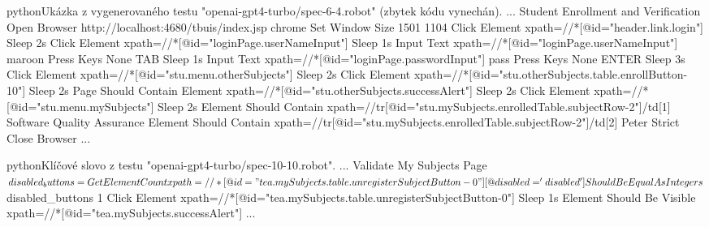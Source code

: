 \documentclass[czech, ma, kiv, he, iso690numb, pdf, viewonly]{fasthesis}
\begin{document}
            \begin{code}{python}{Ukázka z vygenerovaného testu "openai-gpt4-turbo/spec-6-4.robot" (zbytek kódu vynechán). \label{lst:gpt-4-turbo:spec-6-4}}
...
Student Enrollment and Verification
    Open Browser    http://localhost:4680/tbuis/index.jsp    chrome
    Set Window Size    1501    1104
    Click Element    xpath=//*[@id="header.link.login"]
    Sleep    2s
    Click Element    xpath=//*[@id="loginPage.userNameInput"]
    Sleep    1s
    Input Text    xpath=//*[@id="loginPage.userNameInput"]    maroon
    Press Keys    None    TAB
    Sleep    1s
    Input Text    xpath=//*[@id="loginPage.passwordInput"]    pass
    Press Keys    None    ENTER
    Sleep    3s
    Click Element    xpath=//*[@id="stu.menu.otherSubjects"]
    Sleep    2s
    Click Element    xpath=//*[@id="stu.otherSubjects.table.enrollButton-10"]
    Sleep    2s
    Page Should Contain Element    xpath=//*[@id="stu.otherSubjects.successAlert"]
    Sleep    2s
    Click Element    xpath=//*[@id="stu.menu.mySubjects"]
    Sleep    2s
    Element Should Contain    xpath=//tr[@id="stu.mySubjects.enrolledTable.subjectRow-2"]/td[1]    Software Quality Assurance
    Element Should Contain    xpath=//tr[@id="stu.mySubjects.enrolledTable.subjectRow-2"]/td[2]    Peter Strict
    Close Browser
...
            \end{code}

            \begin{code}{python}{Klíčové slovo z testu "openai-gpt4-turbo/spec-10-10.robot". \label{lst:gpt-4-turbo:spec-10-10}}
...
Validate My Subjects Page
    ${disabled_buttons}=    Get Element Count    xpath=//*[@id="tea.mySubjects.table.unregisterSubjectButton-0"][@disabled='disabled']
    Should Be Equal As Integers    ${disabled_buttons}    1
    Click Element    xpath=//*[@id="tea.mySubjects.table.unregisterSubjectButton-0"]
    Sleep    1s
    Element Should Be Visible    xpath=//*[@id="tea.mySubjects.successAlert"]
...
            \end{code}

\end{document}
